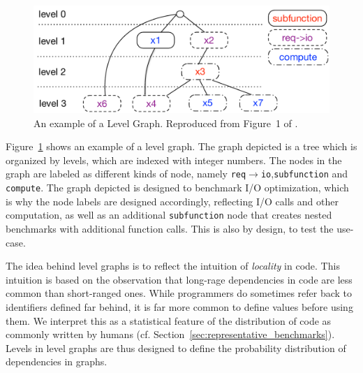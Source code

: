 \begin{figure}[th]
	\centering
	\includegraphics[width=\textwidth]{figures/level-graph.pdf}
	\caption{An example of a Level Graph. Reproduced from Figure~1 of \cite{goens_multiprog18}.}
	\label{fig:level_graph}
\end{figure}

Figure~\ref{fig:level_graph} shows an example of a level graph. The graph depicted is a tree which is organized by levels, which are indexed with integer numbers.
The nodes in the graph are labeled as different kinds of node, namely \texttt{req$\rightarrow$io},\texttt{subfunction} and \texttt{compute}.
The graph depicted is designed to benchmark \ac{I/O} optimization, which is why the node labels are designed accordingly, reflecting \ac{I/O} calls and other computation,
as well as an additional \texttt{subfunction} node that creates nested benchmarks with additional function calls.
This is also by design, to test the use-case.

The idea behind level graphs is to reflect the intuition of \emph{locality} in code.
This intuition is based on the observation that long-rage dependencies in code are less common than short-ranged ones.
While programmers do sometimes refer back to identifiers defined far behind, it is far more common to define values before using them.
We interpret this as a statistical feature of the distribution of code as commonly written by humans (cf. Section~\ref{sec:representative_benchmarks}).
Levels in level graphs are thus designed to define the probability distribution of dependencies in graphs.

